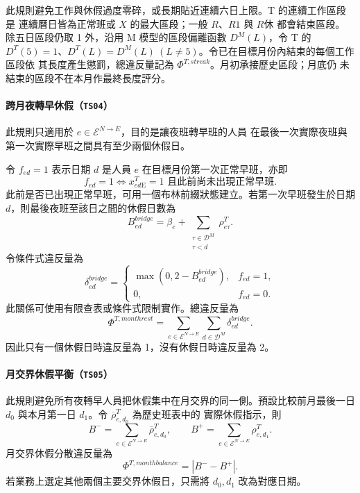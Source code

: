 \documentclass[12pt]{article}
\begin{document}
此規則避免工作與休假過度零碎，或長期貼近連續六日上限。T 的連續工作區段是
連續曆日皆為正常班或 \(X\) 的最大區段；一般 \(R\)、\(R1\) 與 \(R休\) 都會結束區段。
除五日區段仍取 1 外，沿用 M 模型的區段偏離函數 \(D^M(L)\)，令 T 的
\(D^T(5)=1\)、\(D^T(L)=D^M(L)\ (L\neq5)\)。令已在目標月份內結束的每個工作區段依
其長度產生懲罰，總違反量記為 \(\Phi^{T,streak}\)。月初承接歷史區段；月底仍
未結束的區段不在本月作最終長度評分。

\paragraph{跨月夜轉早休假（\texttt{TS04}）}

此規則只適用於 \(e\in\mathcal{E}^{N\rightarrow E}\)，目的是讓夜班轉早班的人員
在最後一次實際夜班與第一次實際早班之間具有至少兩個休假日。

令 \(f_{ed}=1\) 表示日期 \(d\) 是人員 \(e\) 在目標月份第一次正常早班，亦即
\[
  f_{ed}=1
  \Longleftrightarrow
  x^{T}_{ed\mathrm{E}}=1
  \text{ 且此前尚未出現正常早班}.
\]
此前是否已出現正常早班，可用一個布林前綴狀態建立。若第一次早班發生於日期
\(d\)，則最後夜班至該日之間的休假日數為
\[
  B^{bridge}_{ed}
  =
  \beta_e
  +
  \sum_{\substack{\tau\in\mathcal{D}^{M}\\\tau<d}}\rho^{T}_{e\tau}.
\]
令條件式違反量為
\[
  \delta^{bridge}_{ed}
  =
  \begin{cases}
    \max(0,2-B^{bridge}_{ed}), & f_{ed}=1,\\
    0, & f_{ed}=0.
  \end{cases}
\]
此關係可使用有限查表或條件式限制實作。總違反量為
\[
  \Phi^{T,monthrest}
  =
  \sum_{e\in\mathcal{E}^{N\rightarrow E}}
  \sum_{d\in\mathcal{D}^{M}}\delta^{bridge}_{ed}.
\]
因此只有一個休假日時違反量為 1，沒有休假日時違反量為 2。

\paragraph{月交界休假平衡（\texttt{TS05}）}

此規則避免所有夜轉早人員把休假集中在月交界的同一側。預設比較前月最後一日
\(d_0\) 與本月第一日 \(d_1\)。令 \(\overline{\rho}^{T}_{e,d_0}\) 為歷史班表中的
實際休假指示，則
\[
  B^{-}
  =
  \sum_{e\in\mathcal{E}^{N\rightarrow E}}
  \overline{\rho}^{T}_{e,d_0},
  \qquad
  B^{+}
  =
  \sum_{e\in\mathcal{E}^{N\rightarrow E}}
  \rho^{T}_{e,d_1}.
\]
月交界休假分散違反量為
\[
  \Phi^{T,monthbalance}=|B^{-}-B^{+}|.
\]
若業務上選定其他兩個主要交界休假日，只需將 \(d_0,d_1\) 改為對應日期。
\end{document}
